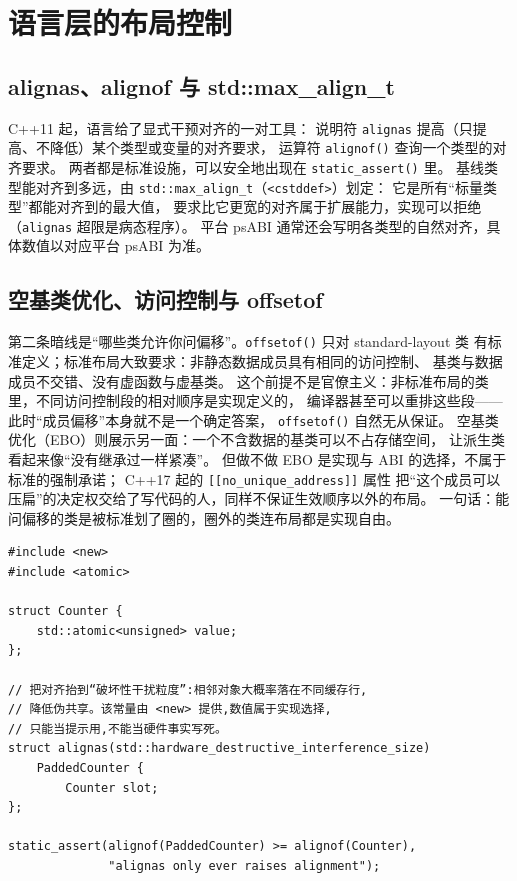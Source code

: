 \documentclass[12pt,a4paper,fontset=fandol]{ctexbook}
\newcommand{\cpp}[1]{C++#1}
\newcommand{\Fn}[1]{\texttt{#1()}}
\newcommand{\Tp}[1]{\texttt{#1}}
\begin{document}
\section{语言层的布局控制}\label{sec:cl11-lang-control}

\subsection{alignas、alignof 与 std::max\_align\_t}\label{sec:cl11-alignas}

\cpp{11} 起，语言给了显式干预对齐的一对工具：
说明符 \Tp{alignas} 提高（只提高、不降低）某个类型或变量的对齐要求，
运算符 \Fn{alignof} 查询一个类型的对齐要求。
两者都是标准设施，可以安全地出现在 \Fn{static\_assert} 里。
基线类型能对齐到多远，由 \Tp{std::max\_align\_t}（\Tp{<cstddef>}）划定：
它是所有“标量类型”都能对齐到的最大值，
要求比它更宽的对齐属于扩展能力，实现可以拒绝（\Tp{alignas} 超限是病态程序）。
平台 psABI 通常还会写明各类型的自然对齐，具体数值以对应平台 psABI 为准。

\subsection{空基类优化、访问控制与 offsetof}\label{sec:cl11-stdlayout}

第二条暗线是“哪些类允许你问偏移”。\Fn{offsetof} 只对 standard-layout 类
有标准定义；标准布局大致要求：非静态数据成员具有相同的访问控制、
基类与数据成员不交错、没有虚函数与虚基类。
这个前提不是官僚主义：非标准布局的类里，不同访问控制段的相对顺序是实现定义的，
编译器甚至可以重排这些段——此时“成员偏移”本身就不是一个确定答案，
\Fn{offsetof} 自然无从保证。
空基类优化（EBO）则展示另一面：一个不含数据的基类可以不占存储空间，
让派生类看起来像“没有继承过一样紧凑”。
但做不做 EBO 是实现与 ABI 的选择，不属于标准的强制承诺；
\cpp{17} 起的 \Tp{[[no\_unique\_address]]} 属性
把“这个成员可以压扁”的决定权交给了写代码的人，同样不保证生效顺序以外的布局。
一句话：能问偏移的类是被标准划了圈的，圈外的类连布局都是实现自由。

\begin{lstlisting}[style=cppstyle, caption={过对齐与缓存行粒度的标准写法（C++17 设施）}]
#include <new>
#include <atomic>

struct Counter {
    std::atomic<unsigned> value;
};

// 把对齐抬到“破坏性干扰粒度”:相邻对象大概率落在不同缓存行,
// 降低伪共享。该常量由 <new> 提供,数值属于实现选择,
// 只能当提示用,不能当硬件事实写死。
struct alignas(std::hardware_destructive_interference_size)
    PaddedCounter {
        Counter slot;
};

static_assert(alignof(PaddedCounter) >= alignof(Counter),
              "alignas only ever raises alignment");
\end{lstlisting}
\end{document}
